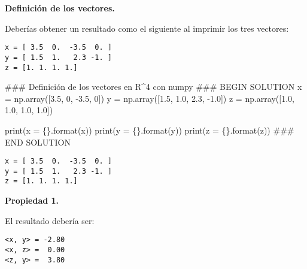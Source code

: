 \documentclass[
  letterpaper,
  DIV=11,
  numbers=noendperiod]{scrreprt}
\newenvironment{Shaded}{\begin{snugshade}}{\end{snugshade}}
\newcommand{\BuiltInTok}[1]{\textcolor[rgb]{0.00,0.23,0.31}{#1}}
\newcommand{\CommentTok}[1]{\textcolor[rgb]{0.37,0.37,0.37}{#1}}
\newcommand{\DecValTok}[1]{\textcolor[rgb]{0.68,0.00,0.00}{#1}}
\newcommand{\FloatTok}[1]{\textcolor[rgb]{0.68,0.00,0.00}{#1}}
\newcommand{\NormalTok}[1]{\textcolor[rgb]{0.00,0.23,0.31}{#1}}
\newcommand{\OperatorTok}[1]{\textcolor[rgb]{0.37,0.37,0.37}{#1}}
\newcommand{\RegionMarkerTok}[1]{\textcolor[rgb]{0.00,0.23,0.31}{#1}}
\newcommand{\SpecialCharTok}[1]{\textcolor[rgb]{0.37,0.37,0.37}{#1}}
\newcommand{\StringTok}[1]{\textcolor[rgb]{0.13,0.47,0.30}{#1}}
\begin{document}
\textbf{Definición de los vectores.}

Deberías obtener un resultado como el siguiente al imprimir los tres
vectores:

\begin{verbatim}
x = [ 3.5  0.  -3.5  0. ]
y = [ 1.5  1.   2.3 -1. ]
z = [1. 1. 1. 1.]
\end{verbatim}

\begin{Shaded}
\begin{Highlighting}[]
\CommentTok{\#\#\# Definición de los vectores en R\^{}4 con numpy}
\CommentTok{\#\#\# }\RegionMarkerTok{BEGIN}\CommentTok{ SOLUTION}
\NormalTok{x }\OperatorTok{=}\NormalTok{ np.array([}\FloatTok{3.5}\NormalTok{, }\DecValTok{0}\NormalTok{, }\OperatorTok{{-}}\FloatTok{3.5}\NormalTok{, }\DecValTok{0}\NormalTok{])}
\NormalTok{y }\OperatorTok{=}\NormalTok{ np.array([}\FloatTok{1.5}\NormalTok{, }\FloatTok{1.0}\NormalTok{, }\FloatTok{2.3}\NormalTok{, }\OperatorTok{{-}}\FloatTok{1.0}\NormalTok{])}
\NormalTok{z }\OperatorTok{=}\NormalTok{ np.array([}\FloatTok{1.0}\NormalTok{, }\FloatTok{1.0}\NormalTok{, }\FloatTok{1.0}\NormalTok{, }\FloatTok{1.0}\NormalTok{])}

\BuiltInTok{print}\NormalTok{(}\StringTok{\textquotesingle{}x = }\SpecialCharTok{\{\}}\StringTok{\textquotesingle{}}\NormalTok{.}\BuiltInTok{format}\NormalTok{(x))}
\BuiltInTok{print}\NormalTok{(}\StringTok{\textquotesingle{}y = }\SpecialCharTok{\{\}}\StringTok{\textquotesingle{}}\NormalTok{.}\BuiltInTok{format}\NormalTok{(y))}
\BuiltInTok{print}\NormalTok{(}\StringTok{\textquotesingle{}z = }\SpecialCharTok{\{\}}\StringTok{\textquotesingle{}}\NormalTok{.}\BuiltInTok{format}\NormalTok{(z))}
\CommentTok{\#\#\# }\RegionMarkerTok{END}\CommentTok{ SOLUTION}
\end{Highlighting}
\end{Shaded}

\begin{verbatim}
x = [ 3.5  0.  -3.5  0. ]
y = [ 1.5  1.   2.3 -1. ]
z = [1. 1. 1. 1.]
\end{verbatim}

\textbf{Propiedad 1.}

El resultado debería ser:

\begin{verbatim}
<x, y> = -2.80
<x, z> =  0.00
<z, y> =  3.80
\end{verbatim}
\end{document}

